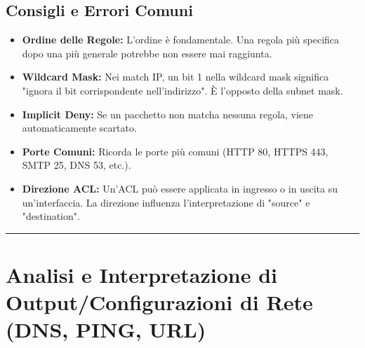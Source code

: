 \subsection{Consigli e Errori Comuni}
\begin{itemize}
    \item \textbf{Ordine delle Regole:} L'ordine è fondamentale. Una regola più specifica dopo una più generale potrebbe non essere mai raggiunta.
    \item \textbf{Wildcard Mask:} Nei match IP, un bit 1 nella wildcard mask significa "ignora il bit corrispondente nell'indirizzo". È l'opposto della subnet mask.
    \item \textbf{Implicit Deny:} Se un pacchetto non matcha nessuna regola, viene automaticamente scartato.
    \item \textbf{Porte Comuni:} Ricorda le porte più comuni (HTTP 80, HTTPS 443, SMTP 25, DNS 53, etc.).
    \item \textbf{Direzione ACL:} Un'ACL può essere applicata in ingresso o in uscita su un'interfaccia. La direzione influenza l'interpretazione di "source" e "destination".
\end{itemize}

\hrule %

\section{Analisi e Interpretazione di Output/Configurazioni di Rete (DNS, PING, URL)}

